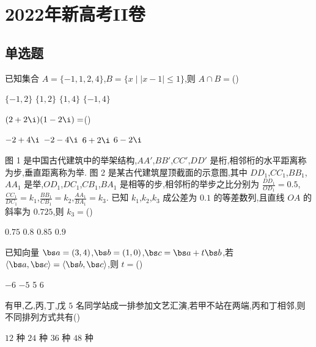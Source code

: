 
\chapter{2022年新高考II卷}

\section{单选题}

\begin{problem}
已知集合 \(A=\{-1,1,2,4\}\),\(B=\{x\mid |x-1|\le 1\}\),则 \(A\cap B=\)(\quad)

\choices
    {\(\{-1,2\}\)}
    {\(\{1,2\}\)}
    {\(\{1,4\}\)}
    {\(\{-1,4\}\)}
\end{problem}

\begin{problem}
\((2+2\i)(1-2\i)=\)(\quad)

\choices
    {\(-2+4\i\)}
    {\(-2-4\i\)}
    {\(6+2\i\)}
    {\(6-2\i\)}
\end{problem}

\begin{problem}
图 1 是中国古代建筑中的举架结构,\(AA'\),\(BB'\),\(CC'\),\(DD'\) 是桁,相邻桁的水平距离称为步,垂直距离称为举. 图 2 是某古代建筑屋顶截面的示意图,其中 \(DD_1\),\(CC_1\),\(BB_1\),\(AA_1\) 是举,\(OD_1\),\(DC_1\),\(CB_1\),\(BA_1\) 是相等的步,相邻桁的举步之比分别为 \(\frac{DD_1}{OD_1}=0.5\),\(\frac{CC_1}{DC_1}=k_1\),\(\frac{BB_1}{CB_1}=k_2\),\(\frac{AA_1}{BA_1}=k_3\).
已知 \(k_1\),\(k_2\),\(k_3\) 成公差为 \(0.1\) 的等差数列,且直线 \(OA\) 的斜率为 \(0.725\),则 \(k_3=\)(\quad)


\choices
    {\(0.75\)}
    {\(0.8\)}
    {\(0.85\)}
    {\(0.9\)}
\end{problem}

\begin{problem}
已知向量 \(\bs a=(3,4)\),\(\bs b=(1,0)\),\(\bs c=\bs a+t\bs b\),若 \(\langle \bs a,\bs c\rangle=\langle \bs b,\bs c\rangle\),则 \(t=\)(\quad)

\choices
    {\(-6\)}
    {\(-5\)}
    {5}
    {6}
\end{problem}

\begin{problem}
有甲,乙,丙,丁,戊 \(5\) 名同学站成一排参加文艺汇演,若甲不站在两端,丙和丁相邻,则不同排列方式共有(\quad)

\choices
    {\(12\) 种}
    {\(24\) 种}
    {\(36\) 种}
    {\(48\) 种}
\end{problem}

